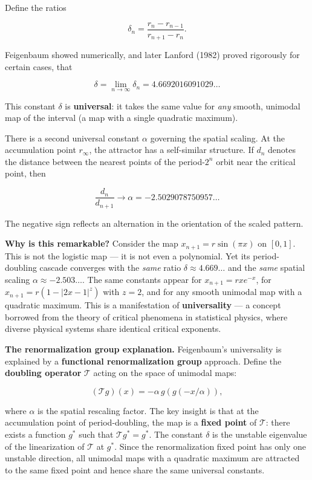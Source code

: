 \begin{definition}\label{def:5.4}
Define the ratios

\[
\delta_n = \frac{r_n - r_{n-1}}{r_{n+1} - r_n}.
\]

Feigenbaum showed numerically, and later Lanford (1982) proved rigorously for certain cases, that

\begin{equation}\label{eq:5.10}\tag{5.10}
\delta = \lim_{n \to \infty} \delta_n = 4.6692016091029\ldots
\end{equation}

This constant $\delta$ is \textbf{universal}: it takes the same value for \textit{any} smooth, unimodal map of the interval (a map with a single quadratic maximum).

There is a second universal constant $\alpha$ governing the spatial scaling. At the accumulation point $r_\infty$, the attractor has a self-similar structure. If $d_n$ denotes the distance between the nearest points of the period-$2^n$ orbit near the critical point, then

\begin{equation}\label{eq:5.11}\tag{5.11}
\frac{d_n}{d_{n+1}} \to \alpha = -2.5029078750957\ldots
\end{equation}

The negative sign reflects an alternation in the orientation of the scaled pattern.

\textbf{Why is this remarkable?} Consider the map $x_{n+1} = r\sin(\pi x)$ on $[0,1]$. This is not the logistic map --- it is not even a polynomial. Yet its period-doubling cascade converges with the \textit{same} ratio $\delta \approx 4.669\ldots$ and the \textit{same} spatial scaling $\alpha \approx -2.503\ldots$. The same constants appear for $x_{n+1} = r x e^{-x}$, for $x_{n+1} = r(1 - |2x - 1|^z)$ with $z = 2$, and for any smooth unimodal map with a quadratic maximum. This is a manifestation of \textbf{universality} --- a concept borrowed from the theory of critical phenomena in statistical physics, where diverse physical systems share identical critical exponents.

\textbf{The renormalization group explanation.} Feigenbaum's universality is explained by a \textbf{functional renormalization group} approach. Define the \textbf{doubling operator} $\mathcal{T}$ acting on the space of unimodal maps:

\[
(\mathcal{T}g)(x) = -\alpha \, g(g(-x/\alpha)),
\]

where $\alpha$ is the spatial rescaling factor. The key insight is that at the accumulation point of period-doubling, the map is a \textbf{fixed point} of $\mathcal{T}$: there exists a function $g^*$ such that $\mathcal{T}g^* = g^*$. The constant $\delta$ is the unstable eigenvalue of the linearization of $\mathcal{T}$ at $g^*$. Since the renormalization fixed point has only one unstable direction, all unimodal maps with a quadratic maximum are attracted to the same fixed point and hence share the same universal constants.


\end{definition}
